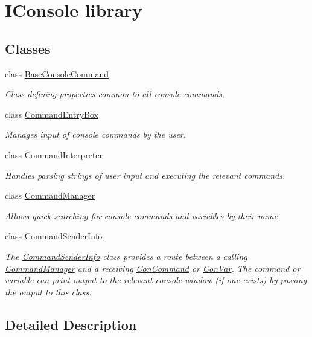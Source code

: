 \hypertarget{group___i_console}{\section{I\-Console library}
\label{group___i_console}
}
\subsection*{Classes}
\begin{DoxyCompactItemize}
\item 
class \hyperlink{class_base_console_command}{Base\-Console\-Command}
\begin{DoxyCompactList}\small\item\em Class defining properties common to all console commands. \end{DoxyCompactList}\item 
class \hyperlink{class_command_entry_box}{Command\-Entry\-Box}
\begin{DoxyCompactList}\small\item\em Manages input of console commands by the user. \end{DoxyCompactList}\item 
class \hyperlink{class_command_interpreter}{Command\-Interpreter}
\begin{DoxyCompactList}\small\item\em Handles parsing strings of user input and executing the relevant commands. \end{DoxyCompactList}\item 
class \hyperlink{class_command_manager}{Command\-Manager}
\begin{DoxyCompactList}\small\item\em Allows quick searching for console commands and variables by their name. \end{DoxyCompactList}\item 
class \hyperlink{class_command_sender_info}{Command\-Sender\-Info}
\begin{DoxyCompactList}\small\item\em The \hyperlink{class_command_sender_info}{Command\-Sender\-Info} class provides a route between a calling \hyperlink{class_command_manager}{Command\-Manager} and a receiving \hyperlink{class_con_command}{Con\-Command} or \hyperlink{class_con_var}{Con\-Var}. The command or variable can print output to the relevant console window (if one exists) by passing the output to this class. \end{DoxyCompactList}\end{DoxyCompactItemize}


\subsection{Detailed Description}
